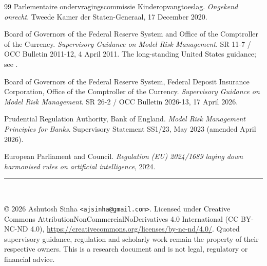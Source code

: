 \documentclass[11pt,a4paper]{article}
\renewcommand{\_}{\oldunderscore\allowbreak}
\theoremstyle{plain}
\theoremstyle{definition}
\theoremstyle{definition}
\theoremstyle{remark}
\begin{document}
\begin{thebibliography}{99}
 Parlementaire ondervragingscommissie Kinderopvangtoeslag. \emph{Ongekend
onrecht}. Tweede Kamer der Staten-Generaal, 17 December 2020.

 Board of Governors of the Federal Reserve System and Office of the Comptroller of the
Currency. \emph{Supervisory Guidance on Model Risk Management}. SR 11-7 / OCC Bulletin 2011-12,
4 April 2011. The long-standing United States guidance; see .

 Board of Governors of the Federal Reserve System, Federal Deposit Insurance
Corporation, Office of the Comptroller of the Currency. \emph{Supervisory Guidance on Model Risk
Management}. SR 26-2 / OCC Bulletin 2026-13, 17 April 2026.

 Prudential Regulation Authority, Bank of England. \emph{Model Risk Management
Principles for Banks}. Supervisory Statement SS1/23, May 2023 (amended April 2026).

 European Parliament and Council. \emph{Regulation (EU) 2024/1689 laying down
harmonised rules on artificial intelligence}, 2024.

\end{thebibliography}

\vspace{1.5em}
\noindent\rule{\linewidth}{0.4pt}\\[4pt]
{\footnotesize\raggedright
\copyright{} 2026 Ashutosh Sinha \texttt{<ajsinha@gmail.com>}. Licensed under
Creative Commons Attribution\textendash NonCommercial\textendash NoDerivatives 4.0
International (CC BY-NC-ND 4.0), \url{https://creativecommons.org/licenses/by-nc-nd/4.0/}.
Quoted supervisory guidance, regulation and scholarly work remain the property of their
respective owners. This is a research document and is not legal, regulatory or financial
advice.\par}
\end{document}
